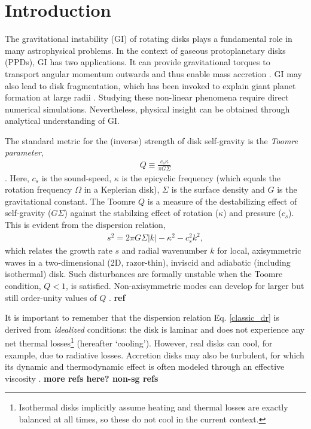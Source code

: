\documentclass[iop, numberedappendix]{emulateapj}
\begin{document}
\section{Introduction}\label{intro} 
The gravitational instability (GI) of rotating disks    
plays a fundamental role in many astrophysical problems. In the context of 
gaseous protoplanetary disks (PPDs), GI has two applications. It can  
provide gravitational torques to transport angular momentum outwards
and thus enable mass accretion \citep{armitage10,turner14}.   
GI may also lead to disk fragmentation, which has been invoked to 
explain giant planet formation at large radii
\citep{helled14}. Studying these non-linear phenomena require direct      
numerical simulations. Nevertheless, physical insight can be  
obtained through analytical understanding of GI. 

The standard metric for the (inverse) strength of disk self-gravity is
the \emph{Toomre parameter}, 
\begin{align}\label{toomreQ_criterion}
  Q \equiv \frac{c_s\kappa}{\pi G \Sigma}  
\end{align}
\citep{toomre64}. Here, $c_s$ is the sound-speed,
$\kappa$ is the epicyclic frequency (which equals the rotation
frequency $\Omega$ in a Keplerian disk), $\Sigma$ is the surface
density and $G$ is the gravitational constant. The Toomre $Q$ is a
measure of the destabilizing effect of self-gravity ($G\Sigma$) against 
the stabilzing effect of rotation ($\kappa$) and pressure 
($c_s$). This is evident from the dispersion relation, 
\begin{align}\label{classic_dr}
  s^2 =  2\pi G\Sigma|k| - \kappa^2 - c_s^2k^2,   
\end{align}
which relates the growth rate $s$ and radial wavenumber $k$ for local,
axisymmetric waves in a two-dimensional (2D, razor-thin), inviscid and
adiabatic (including isothermal) disk. Such disturbances are formally
unstable when the Toomre condition, $Q<1$, is satisfied.
Non-axisymmetric modes can develop for  larger but still order-unity
values of $Q$ . {\bf ref} 


It is important to remember that the dispersion relation
Eq. \ref{classic_dr}  is derived from \emph{idealized} conditions: 
the disk is laminar and does not experience any net thermal
losses\footnote{Isothermal disks implicitly assume  
  heating and thermal losses are exactly balanced at all 
  times, so these do not cool in the current context.} 
(hereafter `cooling').  
However, real disks can cool, for example,
due to radiative losses. Accretion disks may also be turbulent, for
which its dynamic and thermodynamic effect is often modeled through an
effective viscosity \citep{shakura73,lin87,rafikov15}. {\bf 
  more refs here? non-sg refs} 
\end{document}
